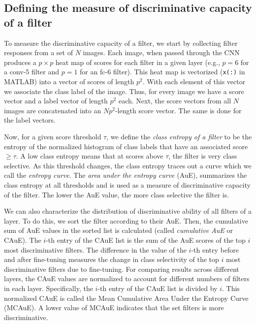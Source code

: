 \subsection{Defining the measure of discriminative capacity of a filter}
\label{sub:fine-entropy}

To measure the discriminative capacity of a filter, we start by collecting filter responses from a set of $N$ images.
Each image, when passed through the CNN produces a $p \times p$ heat map of scores for each filter in a given layer (e.g., $p = 6$ for a conv-5 filter and $p = 1$ for an fc-6 filter).
This heat map is vectorized (\texttt{x(:)} in MATLAB) into a vector of scores of length $p^2$. With each element of this vector we associate the class label of the image. 
Thus, for every image we have a score vector and a label vector of length $p^2$ each.
Next, the score vectors from all $N$ images are concatenated into an $Np^2$-length score vector.
The same is done for the label vectors.

Now, for a given score threshold $\tau$, we define the \emph{class entropy of a filter} to be the entropy of the normalized histogram of class labels that have an associated score $\geq \tau$.
A low class entropy means that at scores above $\tau$, the filter is very class selective.
As this threshold changes, the class entropy traces out a curve which we call the \emph{entropy curve}.
The \emph{area under the entropy curve} (AuE), summarizes the class entropy at all thresholds and is used as a measure of discriminative capacity of the filter. 
The lower the AuE value, the more class selective the filter is.

We can also characterize the distribution of discriminative ability of all filters of a layer.
To do this, we sort the filter according to their AuE.
Then, the cumulative sum of AuE values in the sorted list is calculated (called \emph{cumulative AuE} or CAuE). 
The $i$-th entry of the CAuE list is the sum of the AuE scores of the top $i$ most discriminative filters.
The difference in the value of the $i$-th entry before and after fine-tuning measures the change in class selectivity of the top $i$ most discriminative filters due to fine-tuning.
For comparing results across different layers, the CAuE values are normalized to account for different numbers of filters in each layer. 
Specifically, the $i$-th entry of the CAuE list is divided by $i$. 
This normalized CAuE is called the Mean Cumulative Area Under the Entropy Curve (MCAuE).
A lower value of MCAuE indicates that the set filters is more discriminative.

